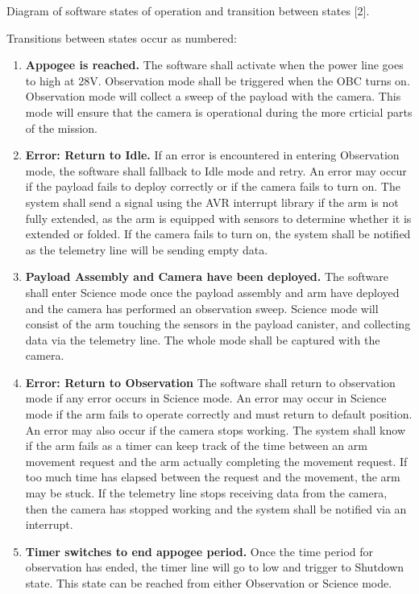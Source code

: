 \begin{center}
Diagram of software states of operation and transition between states [2].

Transitions between states occur as numbered:

\begin{enumerate}
\item{\textbf{Appogee is reached.} The software shall activate when the power line goes to high at 28V. Observation mode shall be 
triggered when the \gls{OBC} turns on. Observation mode will collect a sweep of the payload with the camera. This mode will ensure that the 
camera is operational during the more crticial parts of the mission.}
\item{\textbf{Error: Return to Idle.} If an error is encountered in entering Observation mode, the software shall fallback to Idle 
mode and retry. An error may occur if the payload fails to deploy correctly or if the camera fails to turn on. The system shall send
a signal using the AVR interrupt library if the arm is not fully extended, as the arm is equipped with sensors to determine whether
it is extended or folded. If the camera fails to turn on, the system shall be notified as the telemetry line will be sending empty
data.}
\item{\textbf{Payload Assembly and Camera have been deployed.} The software shall enter Science mode once the payload assembly and arm
 have deployed and the camera has performed an observation sweep. Science mode will consist of the arm touching the sensors in 
 the payload canister, and collecting data via the telemetry line. The whole mode shall be captured with the camera.}
\item{\textbf{Error: Return to Observation} The software shall return to observation mode if any error occurs in Science mode. An error may occur in Science mode if the arm fails to operate correctly and must return to default position. An error may also occur if the camera stops working. The system shall know if the arm fails as a timer can keep track of the time between an arm movement request
and the arm actually completing the movement request. If too much time has elapsed between the request and the movement, the arm may
be stuck. If the telemetry line stops receiving data from the camera, then the camera has stopped working and the system shall be 
notified via an interrupt.}
\item{\textbf{Timer switches to end appogee period.} Once the time period for observation has ended, the timer line will go to low and trigger to Shutdown state. This state can be reached from either Observation or Science mode.}

\end{enumerate}
\end{center}
